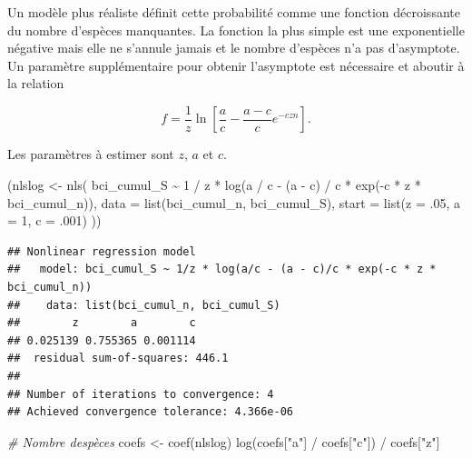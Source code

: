 \documentclass[
  11pt,
  american,
  a4paper,
  extrafontsizes,onecolumn,openright
  ]{memoir}
\newenvironment{Shaded}{\begin{snugshade}}{\end{snugshade}}
\newcommand{\AttributeTok}[1]{\textcolor[rgb]{0.77,0.63,0.00}{#1}}
\newcommand{\CommentTok}[1]{\textcolor[rgb]{0.56,0.35,0.01}{\textit{#1}}}
\newcommand{\DecValTok}[1]{\textcolor[rgb]{0.00,0.00,0.81}{#1}}
\newcommand{\FunctionTok}[1]{\textcolor[rgb]{0.00,0.00,0.00}{#1}}
\newcommand{\NormalTok}[1]{#1}
\newcommand{\OtherTok}[1]{\textcolor[rgb]{0.56,0.35,0.01}{#1}}
\newcommand{\SpecialCharTok}[1]{\textcolor[rgb]{0.00,0.00,0.00}{#1}}
\newcommand{\StringTok}[1]{\textcolor[rgb]{0.31,0.60,0.02}{#1}}
\begin{document}
Un modèle plus réaliste définit cette probabilité comme une fonction décroissante du nombre d'espèces manquantes.
La fonction la plus simple est une exponentielle négative mais elle ne s'annule jamais et le nombre d'espèces n'a pas d'asymptote.
Un paramètre supplémentaire pour obtenir l'asymptote est nécessaire et aboutir à la relation

\begin{equation} 
  \label{eq:Soberon1993b}
  f = \frac{1}{z} \ln \left[ \frac{a}{c} - \frac{a-c}{c} e^{-czn} \right].
\end{equation}

Les paramètres à estimer sont \(z\), \(a\) et \(c\).

\scriptsize

\begin{Shaded}
\begin{Highlighting}[]
\NormalTok{(nlslog }\OtherTok{\textless{}{-}} \FunctionTok{nls}\NormalTok{(}
\NormalTok{  bci\_cumul\_S }\SpecialCharTok{\textasciitilde{}} \DecValTok{1} \SpecialCharTok{/}\NormalTok{ z }\SpecialCharTok{*} \FunctionTok{log}\NormalTok{(a }\SpecialCharTok{/}\NormalTok{ c }\SpecialCharTok{{-}}\NormalTok{ (a }\SpecialCharTok{{-}}\NormalTok{ c) }\SpecialCharTok{/}\NormalTok{ c }\SpecialCharTok{*} \FunctionTok{exp}\NormalTok{(}\SpecialCharTok{{-}}\NormalTok{c }\SpecialCharTok{*}\NormalTok{ z }\SpecialCharTok{*}\NormalTok{ bci\_cumul\_n)), }
  \AttributeTok{data =} \FunctionTok{list}\NormalTok{(bci\_cumul\_n, bci\_cumul\_S), }
  \AttributeTok{start =} \FunctionTok{list}\NormalTok{(}\AttributeTok{z =}\NormalTok{ .}\DecValTok{05}\NormalTok{, }\AttributeTok{a =} \DecValTok{1}\NormalTok{, }\AttributeTok{c =}\NormalTok{ .}\DecValTok{001}\NormalTok{)}
\NormalTok{))}
\end{Highlighting}
\end{Shaded}

\begin{verbatim}
## Nonlinear regression model
##   model: bci_cumul_S ~ 1/z * log(a/c - (a - c)/c * exp(-c * z * bci_cumul_n))
##    data: list(bci_cumul_n, bci_cumul_S)
##        z        a        c 
## 0.025139 0.755365 0.001114 
##  residual sum-of-squares: 446.1
## 
## Number of iterations to convergence: 4 
## Achieved convergence tolerance: 4.366e-06
\end{verbatim}

\begin{Shaded}
\begin{Highlighting}[]
\CommentTok{\# Nombre d\textquotesingle{}espèces}
\NormalTok{coefs }\OtherTok{\textless{}{-}} \FunctionTok{coef}\NormalTok{(nlslog)}
\FunctionTok{log}\NormalTok{(coefs[}\StringTok{"a"}\NormalTok{] }\SpecialCharTok{/}\NormalTok{ coefs[}\StringTok{"c"}\NormalTok{]) }\SpecialCharTok{/}\NormalTok{ coefs[}\StringTok{"z"}\NormalTok{]}
\end{Highlighting}
\end{Shaded}
\end{document}
